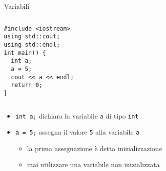 \begin{frame}[fragile]{Variabili}
  \vfill
  \begin{columns}[c]
    \vfill
    \begin{lstlisting}
#include <iostream>
using std::cout;
using std::endl;
int main() {
  int a;
  a = 5;
  cout << a << endl;
  return 0;
}
    \end{lstlisting}
    \vfill
    \vfill
    \begin{center}\end{center}
    \vfill
  \end{columns}
  \vfill
  \begin{itemize}
    \item \lstinline$int a;$ \alert{dichiara} la variabile \lstinline$a$ di \alert{tipo} \lstinline$int$
    \vfill
    \item \lstinline$a = 5;$ \alert{assegna} il valore \lstinline$5$ alla variabile \lstinline$a$
    \begin{itemize}
      \item la prima assegnazione è detta \alert{inizializzazione}
      \item \alert{mai} utilizzare una variabile non inizializzata
    \end{itemize}
  \end{itemize}
  \vfill
\end{frame}

